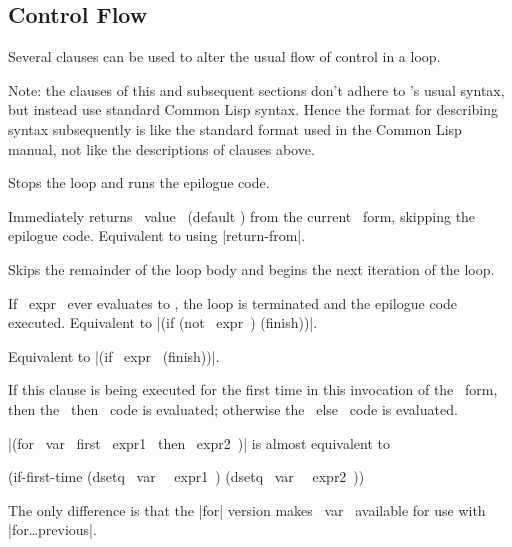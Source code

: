 \subsection{Control Flow}
\label{control-flow}
Several clauses can be used to alter the usual flow of control in a loop.

Note: the clauses of this and subsequent sections don't adhere to \iter's
usual syntax, but instead use standard Common Lisp syntax.  Hence the
format for describing syntax subsequently is
like the standard format used in the Common Lisp manual, not like the
descriptions of clauses above.

\begin{clauses}

Stops the loop and runs the epilogue code.

%
%

Immediately returns ~value~ (default \nil) from the current \iter\
form, skipping the epilogue code.  Equivalent to using |return-from|.

Skips the remainder of the loop body and begins the next iteration of
the loop.

If ~expr~ ever evaluates to \nil, the loop is terminated and the
epilogue code executed.  Equivalent to |(if (not ~expr~) (finish))|.

Equivalent to |(if ~expr~ (finish))|.

If this clause is being executed for the first time in this invocation
of the \iter\ form, then the ~then~ code is evaluated; otherwise the
~else~ code is evaluated.

\cpar |(for ~var~ first ~expr1~ then ~expr2~)| is almost equivalent to
\begin{program}
(if-first-time (dsetq ~var~ ~expr1~)
               (dsetq ~var~ ~expr2~))
\end{program}
The only difference is that the |for| version makes ~var~ available
for use with |for\dots previous|.

\end{clauses}

